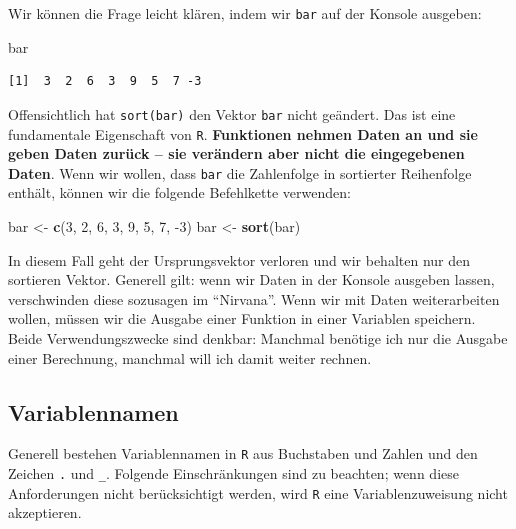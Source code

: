 \documentclass[12pt,]{tufte-book}
\newenvironment{Shaded}{\begin{snugshade}}{\end{snugshade}}
\newcommand{\KeywordTok}[1]{\textcolor[rgb]{0.13,0.29,0.53}{\textbf{#1}}}
\newcommand{\DecValTok}[1]{\textcolor[rgb]{0.00,0.00,0.81}{#1}}
\newcommand{\StringTok}[1]{\textcolor[rgb]{0.31,0.60,0.02}{#1}}
\newcommand{\NormalTok}[1]{#1}
\theoremstyle{definition}
\theoremstyle{definition}
\theoremstyle{definition}
\theoremstyle{remark}
\begin{document}
Wir können die Frage leicht klären, indem wir \texttt{bar} auf der
Konsole ausgeben:

\begin{Shaded}
\begin{Highlighting}[]
\NormalTok{bar}
\end{Highlighting}
\end{Shaded}

\begin{verbatim}
[1]  3  2  6  3  9  5  7 -3
\end{verbatim}

Offensichtlich hat \texttt{sort(bar)} den Vektor \texttt{bar} nicht
geändert. Das ist eine fundamentale Eigenschaft von \texttt{R}.
\textbf{Funktionen nehmen Daten an und sie geben Daten zurück -- sie
verändern aber nicht die eingegebenen Daten}. Wenn wir wollen, dass
\texttt{bar} die Zahlenfolge in sortierter Reihenfolge enthält, können
wir die folgende Befehlkette verwenden:

\begin{Shaded}
\begin{Highlighting}[]
\NormalTok{bar <-}\StringTok{ }\KeywordTok{c}\NormalTok{(}\DecValTok{3}\NormalTok{, }\DecValTok{2}\NormalTok{, }\DecValTok{6}\NormalTok{, }\DecValTok{3}\NormalTok{, }\DecValTok{9}\NormalTok{, }\DecValTok{5}\NormalTok{, }\DecValTok{7}\NormalTok{, }\DecValTok{-3}\NormalTok{)}
\NormalTok{bar <-}\StringTok{ }\KeywordTok{sort}\NormalTok{(bar)}
\end{Highlighting}
\end{Shaded}

In diesem Fall geht der Ursprungsvektor verloren und wir behalten nur
den sortieren Vektor. Generell gilt: wenn wir Daten in der Konsole
ausgeben lassen, verschwinden diese sozusagen im ``Nirvana''. Wenn wir
mit Daten weiterarbeiten wollen, müssen wir die Ausgabe einer Funktion
in einer Variablen speichern. Beide Verwendungszwecke sind denkbar:
Manchmal benötige ich nur die Ausgabe einer Berechnung, manchmal will
ich damit weiter rechnen.

\subsection{Variablennamen}\label{variablennamen}

Generell bestehen Variablennamen in \texttt{R} aus Buchstaben und Zahlen
und den Zeichen \texttt{.} und \texttt{\_}. Folgende Einschränkungen
sind zu beachten; wenn diese Anforderungen nicht berücksichtigt werden,
wird \texttt{R} eine Variablenzuweisung nicht akzeptieren.
\end{document}
